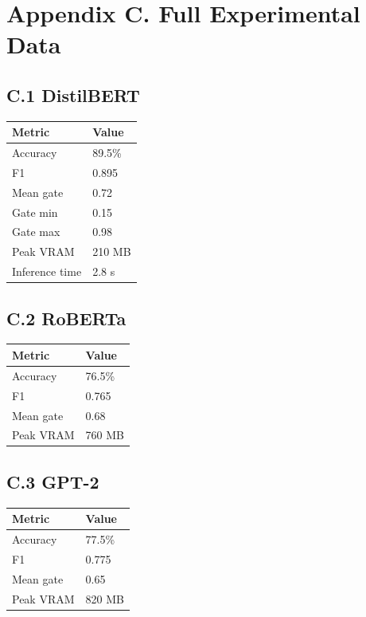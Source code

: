 
\section{Appendix C. Full Experimental Data}

\subsection{C.1 DistilBERT}

\begin{table}[H]
\centering
\small
\begin{tabular}{ll}
\toprule
\textbf{Metric} & \textbf{Value} \\
\midrule
Accuracy & 89.5\% \\
F1 & 0.895 \\
Mean gate & 0.72 \\
Gate min & 0.15 \\
Gate max & 0.98 \\
Peak VRAM & 210 MB \\
Inference time & 2.8 s \\
\bottomrule
\end{tabular}
\end{table}

\subsection{C.2 RoBERTa}

\begin{table}[H]
\centering
\small
\begin{tabular}{ll}
\toprule
\textbf{Metric} & \textbf{Value} \\
\midrule
Accuracy & 76.5\% \\
F1 & 0.765 \\
Mean gate & 0.68 \\
Peak VRAM & 760 MB \\
\bottomrule
\end{tabular}
\end{table}

\subsection{C.3 GPT-2}

\begin{table}[H]
\centering
\small
\begin{tabular}{ll}
\toprule
\textbf{Metric} & \textbf{Value} \\
\midrule
Accuracy & 77.5\% \\
F1 & 0.775 \\
Mean gate & 0.65 \\
Peak VRAM & 820 MB \\
\bottomrule
\end{tabular}
\end{table}

